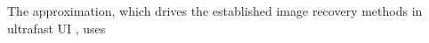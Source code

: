The  approximation, which drives
the established image recovery methods in
ultrafast \ac{UI}
\cite{article:MoghimiradITUFFC2016,article:LabyedITUFFC2014,article:MontaldoITUFFC2009,article:JensenUlt2006,article:ChengITUFFC2006,article:LuITUFFC1997}, uses
